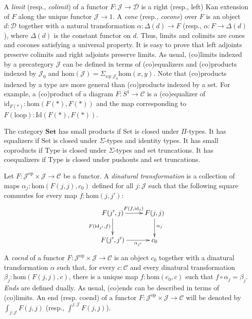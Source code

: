 \documentclass[reqno]{amsart}
\theoremstyle{definition}
\theoremstyle{remark}
\newcommand{\fs}[1]{\mathrm{#1}}
\newcommand{\cat}[1]{\mathbf{#1}}
\newcommand{\scat}[1]{\mathcal{#1}}
\renewcommand{\hom}{\fs{hom}}
\newcommand{\id}{\fs{id}}
\newcommand{\Id}{\fs{Id}}
\newcommand{\Set}{\cat{Set}}
\newcommand{\uSet}{\fs{Set}}
\newcommand{\uType}{\fs{Type}}
\newcommand{\ob}[1]{#1_0}
\numberwithin{figure}{section}
\begin{document}
A \emph{limit} (resp., \emph{colimit}) of a functor $F : \scat{J} \to \scat{D}$ is a right (resp., left) Kan extension of $F$ along the unique functor $\scat{J} \to 1$.
A \emph{cone} (resp., \emph{cocone}) over $F$ is an object $d : \scat{D}$ together with a natural transformation $\alpha : \Delta(d) \to F$ (resp., $\alpha : F \to \Delta(d)$), where $\Delta(d)$ is the constant functor on $d$.
Thus, limits and colimits are cones and cocones satisfying a universal property.
It is easy to prove that left adjoints preserve colimits and right adjoints preserve limits.
As usual, (co)limits indexed by a precategory $\scat{J}$ can be defined in terms of (co)equalizers and (co)products indexed by $\ob{\scat{J}}$ and $\hom(\scat{J}) = \Sigma_{x y : \ob{\scat{J}}} \hom(x,y)$.
Note that (co)products indexed by a type are more general than (co)products indexed by a set.
For example, a (co)product of a diagram $F : S^1 \to \scat{C}$ is a (co)equalizer of $\id_{F(*)} : \hom(F(*),F(*))$ and the map corresponding to $F(\fs{loop}) : \Id(F(*),F(*))$.

\begin{example}
The category $\Set$ has small products if $\uSet$ is closed under $\Pi$-types.
It has equalizers if $\uSet$ is closed under $\Sigma$-types and identity types.
It has small coproducts if $\uType$ is closed under $\Sigma$-types and set truncations.
It has coequalizers if $\uType$ is closed under pushouts and set truncations.
\end{example}

Let $F : \scat{J}^\fs{op} \times \scat{J} \to \scat{C}$ be a functor.
A \emph{dinatural transformation} is a collection of maps $\alpha_j : \hom(F(j,j),c_0)$ defined for all $j : \scat{J}$ such that the following square commutes for every map $f : \hom(j,j')$:
\[ \xymatrix{ F(j',j) \ar[r]^{F(f,\id_j)} \ar[d]_{F(\id_{j'},f)}    & F(j,j) \ar[d]^{\alpha_j} \\
              F(j',j') \ar[r]_-{\alpha_{j'}}                        & c_0
            } \]
A \emph{coend} of a functor $F : \scat{J}^\fs{op} \times \scat{J} \to \scat{C}$ is an object $c_0$ together with a dinatural transformation $\alpha$ such that,
for every $c : \scat{C}$ and every dinatural transformation $\beta_j : \hom(F(j,j),c)$, there is a unique map $f : \hom(c_0,c)$ such that $f \circ \alpha_j = \beta_j$.
\emph{Ends} are defined dually.
As usual, (co)ends can be described in terms of (co)limits.
An end (resp. coend) of a functor $F : \scat{J}^\fs{op} \times \scat{J} \to \scat{C}$ will be denoted by $\int_{j : \scat{J}} F(j,j)$ (resp., $\int^{j : \scat{J}} F(j,j)$).
\end{document}
